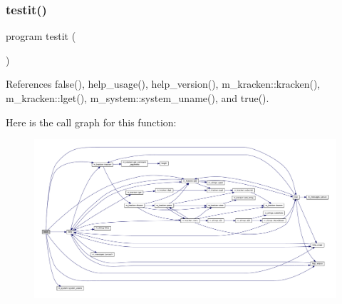 \subsubsection{\texorpdfstring{testit()}{testit()}}
{\footnotesize\ttfamily program testit (\begin{DoxyParamCaption}{ }\end{DoxyParamCaption})}



References false(), help\+\_\+usage(), help\+\_\+version(), m\+\_\+kracken\+::kracken(), m\+\_\+kracken\+::lget(), m\+\_\+system\+::system\+\_\+uname(), and true().

Here is the call graph for this function\+:
\nopagebreak
\begin{figure}[H]
\begin{center}
\leavevmode
\includegraphics[width=350pt]{__uname_8f90_a483d2219923eccf493a883fceee5a424_cgraph}
\end{center}
\end{figure}
